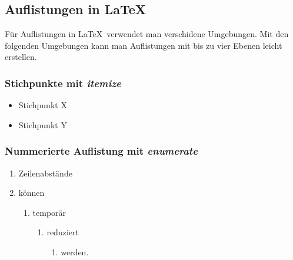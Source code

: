 \documentclass[12pt,a4paper]{article}
\begin{document}
\subsection{Auflistungen in \LaTeX}
Für Auflistungen in \LaTeX\ verwendet man verschidene Umgebungen. Mit den folgenden Umgebungen kann man Auflistungen mit bis zu vier Ebenen leicht erstellen.
\subsubsection{Stichpunkte mit \textbf{\emph{itemize}}}
{


\begin{itemize}%
\item Stichpunkt X
\item Stichpunkt Y
\end{itemize}
\subsubsection{Nummerierte Auflistung mit \textbf{\emph{enumerate}}}
\begin{enumerate}
    \item Zeilenabstände
    \item können
    \begin{enumerate}
        \item temporär
        \begin{enumerate}
            \item reduziert
            \begin{enumerate}
                \item werden.
            \end{enumerate}
        \end{enumerate}
    \end{enumerate}
\end{enumerate}
}
\newpage %
\end{document}
